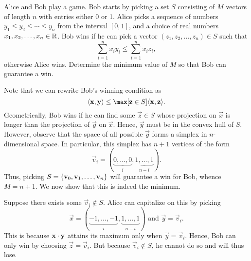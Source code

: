 \begin{question}[$n+1$]\label{Q::2024-O-2-4}
    Alice and Bob play a game. Bob starts by picking a set $S$ consisting of $M$ vectors of length $n$ with entries either 0 or 1. Alice picks a sequence of numbers $y_1 \leq y_2 \leq \cdots \leq y_n$ from the interval $[0, 1]$, and a choice of real numbers $x_1, x_2, \ldots, x_n \in \mathbb{R}$. Bob wins if he can pick a vector $(z_1, z_2, \ldots, z_n) \in S$ such that \[\sum_{i=1}^n x_i y_i \leq \sum_{i=1}^n x_i z_i,\] otherwise Alice wins. Determine the minimum value of $M$ so that Bob can guarantee a win.
\end{question}
\begin{solution*}
    Note that we can rewrite Bob's winning condition as \[\ba{\vec x, \vec y} \leq \max[\vec z \in S] \ba{\vec x, \vec z}.\] Geometrically, Bob wins if he can find some $\vec z \in S$ whose projection on $\vec x$ is longer than the projection of $\vec y$ on $\vec x$. Hence, $\vec y$ must be in the convex hull of $S$. However, observe that the space of all possible $\vec y$ forms a simplex in $n$-dimensional space. In particular, this simplex has $n+1$ vertices of the form \[\vec v_i = (\underbrace{0, \ldots, 0}_{i}, \underbrace{1, \ldots, 1}_{n-i}).\] Thus, picking $S = \left\lbrace \mathbf{v}_0, \mathbf{v}_1, \ldots, \mathbf{v}_n \right\rbrace$ will guarantee a win for Bob, whence $M = n+1$. We now show that this is indeed the minimum.

    Suppose there exists some $\vec v_i \notin S$. Alice can capitalize on this by picking \[\vec x = (\underbrace{-1, \ldots, -1}_{i}, \underbrace{1, \ldots, 1}_{n-i}) \text{ and } \vec y = \vec v_i.\] This is because $\mathbf{x} \cdot \mathbf{y}$ attains its maximum only when $\vec y = \vec v_i$. Hence, Bob can only win by choosing $\vec z = \vec v_i$. But because $\vec v_i \notin S$, he cannot do so and will thus lose.
\end{solution*}

